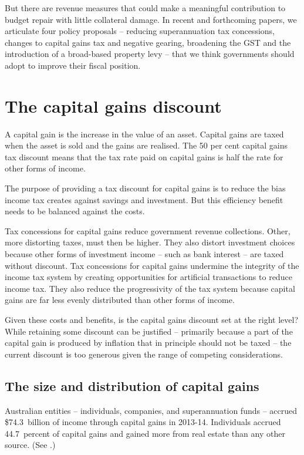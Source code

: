 \documentclass{grattan}\usepackage[]{graphicx}\usepackage[]{color}
\begin{document}
But there are revenue measures that could make a meaningful contribution to budget repair with little collateral damage. In recent and forthcoming papers, we articulate four policy proposals -- reducing superannuation tax concessions, changes to capital gains tax and negative gearing, broadening the GST and the introduction of a broad-based property levy -- that we think governments should adopt to improve their fiscal position.

\chapter{The capital gains discount}
A capital gain is the increase in the value of an asset. Capital gains are taxed when the asset is sold and the gains are realised. The 50 per cent capital gains tax discount means that the tax rate paid on capital gains is half the rate for other forms of income. 

The purpose of providing a tax discount for capital gains is to reduce the bias income tax creates against savings and investment. But this efficiency benefit needs to be balanced against the costs. 

Tax concessions for capital gains reduce government revenue collections. Other, more distorting taxes, must then be higher. They also distort investment choices because other forms of investment income – such as bank interest – are taxed without discount. Tax concessions for capital gains undermine the integrity of the income tax system by creating opportunities for artificial transactions to reduce income tax. They also reduce the progressivity of the tax system because capital gains are far less evenly distributed than other forms of income. 

Given these costs and benefits, is the capital gains discount set at the right level? While retaining some discount can be justified – primarily because a part of the capital gain is produced by inflation that in principle should not be taxed – the current discount is too generous given the range of competing considerations.


\section{The size and distribution of capital gains}




Australian entities -- individuals, companies, and superannuation funds -- accrued \$74.3~billion of income through capital gains in 2013-14. Individuals accrued 44.7~percent
of capital gains and gained more from real estate than any other source. (See .)
\end{document}
